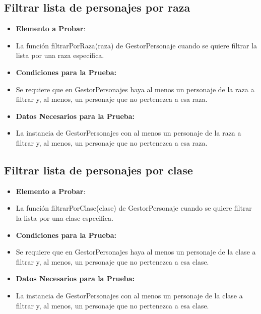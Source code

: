 \documentclass{article}
\begin{document}
\subsection{Filtrar lista de personajes por raza}
\renewcommand{\labelitemi}{}
\begin{itemize}

\item \textbf{Elemento a Probar}: 

\item La función filtrarPorRaza(raza) de GestorPersonaje cuando se quiere filtrar la lista por una raza específica.

\item \textbf{Condiciones para la Prueba:}

\item Se requiere que en GestorPersonajes haya al menos un personaje de la raza a filtrar y, al menos, un personaje que no pertenezca a esa raza.

\item \textbf{Datos Necesarios para la Prueba:}

\item La instancia de GestorPersonajes con al menos un personaje de la raza a filtrar y, al menos, un personaje que no pertenezca a esa raza.

\end{itemize}

\subsection{Filtrar lista de personajes por clase}
\renewcommand{\labelitemi}{}
\begin{itemize}

\item \textbf{Elemento a Probar}: 

\item La función filtrarPorClase(clase) de GestorPersonaje cuando se quiere filtrar la lista por una clase especifica.

\item \textbf{Condiciones para la Prueba:}

\item Se requiere que en GestorPersonajes haya al menos un personaje de la clase a filtrar y, al menos, un personaje que no pertenezca a esa clase.

\item \textbf{Datos Necesarios para la Prueba:}

\item La instancia de GestorPersonajes con al menos un personaje de la clase a filtrar y, al menos, un personaje que no pertenezca a esa clase.

\end{itemize}
\end{document}
